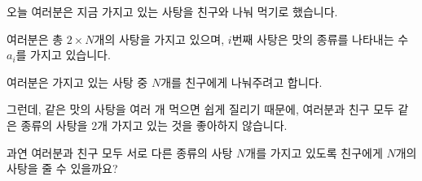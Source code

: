 오늘 여러분은 지금 가지고 있는 사탕을 친구와 나눠 먹기로 했습니다.

여러분은 총 $2\times N$개의 사탕을 가지고 있으며, $i$번째 사탕은 맛의 종류를 나타내는 수 $a_i$를 가지고 있습니다.

여러분은 가지고 있는 사탕 중 $N$개를 친구에게 나눠주려고 합니다.

그런데, 같은 맛의 사탕을 여러 개 먹으면 쉽게 질리기 때문에, 여러분과 친구 모두 같은 종류의 사탕을 $2$개 가지고 있는 것을 좋아하지 않습니다.

과연 여러분과 친구 모두 서로 다른 종류의 사탕 $N$개를 가지고 있도록 친구에게 $N$개의 사탕을 줄 수 있을까요?
